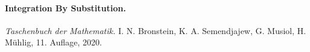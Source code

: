 \documentclass[a4paper,11pt]{article}
\begin{document}
\paragraph{Integration By Substitution.}





\begin{thebibliography}{9}
     \emph{Taschenbuch der Mathematik.}
    I. N. Bronstein, K. A. Semendjajew, G. Musiol, H. Mühlig, 11. Auflage, 2020.
\end{thebibliography}
\end{document}
